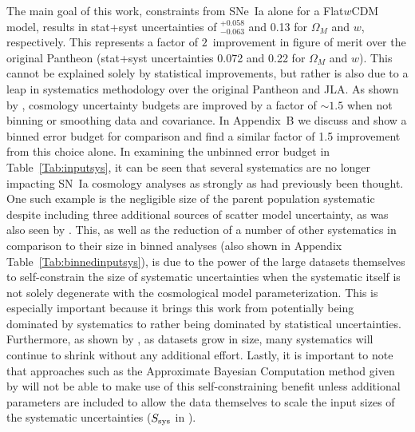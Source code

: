 \documentclass[twocolumn]{aastex63}
\def\fomimprov{$2$}
\begin{document}
    
The main goal of this work, constraints from SNe~Ia alone for a Flat$w$CDM model, results in stat+syst uncertainties of  $^{+0.058}_{-0.063}$ and 0.13 for $\Omega_M$ and $w$, respectively. This represents a factor of \fomimprov~improvement in figure of merit over the original Pantheon {(stat+syst uncertainties 0.072 and 0.22 for $\Omega_M$ and $w$)}. This cannot be explained solely by statistical improvements, but rather is also due to a leap in systematics methodology over the original Pantheon and JLA. As shown by \cite{binning21}, cosmology uncertainty budgets are improved by a factor of $\sim1.5$ when not binning or smoothing data and covariance. In Appendix~B we discuss and show a binned error budget for comparison and find a similar factor of 1.5 improvement from this choice alone. In examining the unbinned error budget in Table~\ref{Tab:inputsys}, it can be seen that several systematics are no longer impacting SN~Ia cosmology analyses as strongly as had previously been thought. One such example is the negligible size of the parent population systematic despite including three additional sources of scatter model uncertainty, as was also seen by \cite{popovic21b}. This, as well as the reduction of a number of other systematics in comparison to their size in binned analyses (also shown in Appendix Table~\ref{Tab:binnedinputsys}), is due to the power of the large datasets themselves to self-constrain the size of systematic uncertainties when the systematic itself is not solely degenerate with the cosmological model parameterization. This is especially important because it brings this work from potentially being dominated by systematics to rather being dominated by statistical uncertainties. Furthermore, as shown by \cite{binning21}, as datasets grow in size, many systematics will continue to shrink without any additional effort. Lastly, it is important to note that approaches such as the Approximate Bayesian Computation method given by \cite{Jennings16} will not be able to make use of this self-constraining benefit unless additional parameters are included to allow the data themselves to scale the input sizes of the systematic uncertainties ($S_{\rm sys}$ in \citealt{binning21}).
\end{document}
